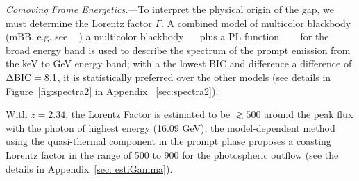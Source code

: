 \documentclass[prd,twocolumn,amsmath,amssymb,aps,linenumbers]{revtex4-2} %
\providecommand{\DIFaddtex}[1]{{\protect\color{blue} \sf #1}} %
\providecommand{\DIFdeltex}[1]{{\protect\color{red} \scriptsize #1}} %
\providecommand{\DIFaddbegin}{} %
\providecommand{\DIFaddend}{} %
\providecommand{\DIFdelbegin}{} %
\providecommand{\DIFdelend}{} %
\providecommand{\DIFadd}[1]{\texorpdfstring{\DIFaddtex{#1}}{#1}} %
\providecommand{\DIFdel}[1]{\texorpdfstring{\DIFdeltex{#1}}{}} %
\newcommand{\DIFscaledelfig}{0.5}
\newlength{\DIFdelgraphicswidth} %
\newlength{\DIFdelgraphicsheight} %
\newcommand{\DIFaddincludegraphics}[2][]{{\color{blue}\fbox{\DIFOincludegraphics[#1]{#2}}}} %
\newcommand{\DIFdelincludegraphics}[2][]{%
\sbox{\DIFdelgraphicsbox}{\DIFOincludegraphics[#1]{#2}}%
\settoboxwidth{\DIFdelgraphicswidth}{\DIFdelgraphicsbox} %
\settoboxtotalheight{\DIFdelgraphicsheight}{\DIFdelgraphicsbox} %
\scalebox{\DIFscaledelfig}{%
\parbox[b]{\DIFdelgraphicswidth}{\usebox{\DIFdelgraphicsbox}\\[-\baselineskip] \rule{\DIFdelgraphicswidth}{0em}}\llap{\resizebox{\DIFdelgraphicswidth}{\DIFdelgraphicsheight}{%
\setlength{\unitlength}{\DIFdelgraphicswidth}%
\begin{picture}(1,1)%
\thicklines\linethickness{2pt} %
{\color[rgb]{1,0,0}\put(0,0){\framebox(1,1){}}}%
{\color[rgb]{1,0,0}\put(0,0){\line( 1,1){1}}}%
{\color[rgb]{1,0,0}\put(0,1){\line(1,-1){1}}}%
\end{picture}%
}\hspace*{3pt}}} %
} %
\DeclareRobustCommand{\DIFaddbegin}{\DIFOaddbegin \let\includegraphics\DIFaddincludegraphics} %
\DeclareRobustCommand{\DIFaddend}{\DIFOaddend \let\includegraphics\DIFOincludegraphics} %
\DeclareRobustCommand{\DIFdelbegin}{\DIFOdelbegin \let\includegraphics\DIFdelincludegraphics} %
\DeclareRobustCommand{\DIFdelend}{\DIFOaddend \let\includegraphics\DIFOincludegraphics} %
\begin{document}
\textit{Comoving Frame Energetics.}---To interpret the physical origin of the gap, we must determine the Lorentz factor $\Gamma$. A combined model of \DIFdelbegin \DIFdel{multicolor blackbody (mBB, e.g. see \mbox{%
\cite[][]{2008ApJ...682..463P,2010ApJ...709L.172R,2018ApJ...866...13H}}\hskip0pt%
) }\DIFdelend \DIFaddbegin \DIFadd{a multicolor blackbody \mbox{%
\citep[mBB, e.g. see][]{2008ApJ...682..463P,2010ApJ...709L.172R,2018ApJ...866...13H} }\hskip0pt%
}\DIFaddend plus a PL function \DIFdelbegin \DIFdel{~\mbox{%
\citep{1993ApJ...413..281B}  }\hskip0pt%
}\DIFdelend for the broad energy band is used to describe the spectrum of \DIFaddbegin \DIFadd{the }\DIFaddend prompt emission from \DIFaddbegin \DIFadd{the }\DIFaddend keV to GeV energy band; with \DIFdelbegin \DIFdel{a }\DIFdelend \DIFaddbegin \DIFadd{the }\DIFaddend lowest BIC and \DIFdelbegin \DIFdel{difference }\DIFdelend \DIFaddbegin \DIFadd{a difference of }\DIFaddend $\Delta \rm{BIC}=8.1$, it is statistically preferred over the other models (see details in Figure~\ref{fig:spectra2} in Appendix\DIFaddbegin \DIFadd{~}\DIFaddend \ref{sec:spectra2}).

With $z=2.34$, the \DIFdelbegin \DIFdel{Lorentz Factor is estimated to be $\gtrsim500$ around the peak flux with the photon of highest energy (16.09 GeV); the }\DIFdelend model-dependent method using the quasi-thermal component in the prompt phase proposes a \DIFaddbegin \DIFadd{coasting Lorentz factor in the }\DIFaddend range of 500 to 900 \DIFaddbegin \DIFadd{for the photospheric outflow }\DIFaddend (see the details in Appendix~\ref{sec: estiGamma}). \DIFdelbegin %
\end{document}
